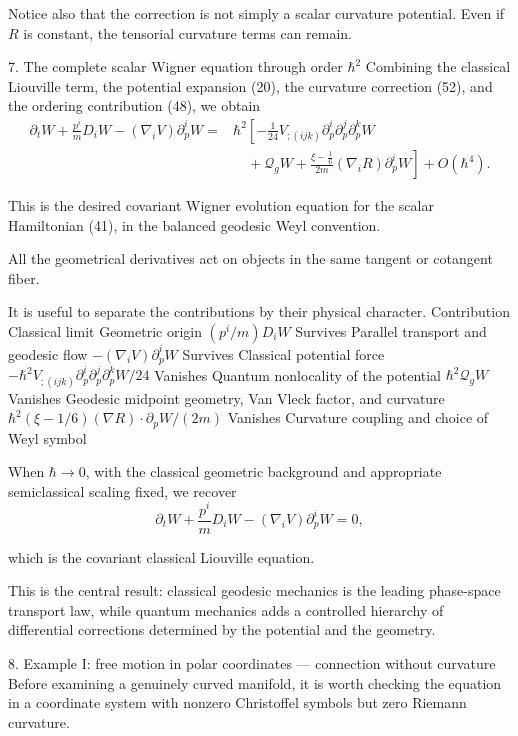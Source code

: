 Notice also that the correction is not simply a scalar curvature potential. Even if \(R\) is constant, the tensorial curvature terms can remain.

7. The complete scalar Wigner equation through order \(\hbar^2\)
Combining the classical Liouville term, the potential expansion (20), the curvature correction (52), and the ordering contribution (48), we obtain
\[
\boxed{
\begin{aligned}
\partial_tW
+\frac{p^i}{m}D_iW
-(\nabla_iV)\partial_p^iW
={}&\hbar^2\left[
-\frac1{24}
V_{;(ijk)}
\partial_p^i\partial_p^j\partial_p^kW
\right.\\
&\left.\quad+\mathcal Q_gW
+\frac{\xi-\frac16}{2m}
(\nabla_iR)\partial_p^iW
\right]
+O(\hbar^4).
\end{aligned}
}
\tag{53}
\]

This is the desired covariant Wigner evolution equation for the scalar Hamiltonian (41), in the balanced geodesic Weyl convention.

All the geometrical derivatives act on objects in the same tangent or cotangent fiber.

It is useful to separate the contributions by their physical character.
Contribution	Classical limit	Geometric origin
\((p^i/m)D_iW\)	Survives	Parallel transport and geodesic flow
\(-(\nabla_iV)\partial_p^iW\)	Survives	Classical potential force
\(-\hbar^2V_{;(ijk)}\partial_p^i\partial_p^j\partial_p^kW/24\)	Vanishes	Quantum nonlocality of the potential
\(\hbar^2\mathcal Q_gW\)	Vanishes	Geodesic midpoint geometry, Van Vleck factor, and curvature
\(\hbar^2(\xi-1/6)(\nabla R)\cdot\partial_pW/(2m)\)	Vanishes	Curvature coupling and choice of Weyl symbol

When \(\hbar\to0\), with the classical geometric background and appropriate semiclassical scaling fixed, we recover
\[
\boxed{
\partial_tW+
\frac{p^i}{m}D_iW-
(\nabla_iV)\partial_p^iW=0,
}
\tag{54}
\]

which is the covariant classical Liouville equation.

This is the central result: classical geodesic mechanics is the leading phase-space transport law, while quantum mechanics adds a controlled hierarchy of differential corrections determined by the potential and the geometry.

8. Example I: free motion in polar coordinates — connection without curvature
Before examining a genuinely curved manifold, it is worth checking the equation in a coordinate system with nonzero Christoffel symbols but zero Riemann curvature.

